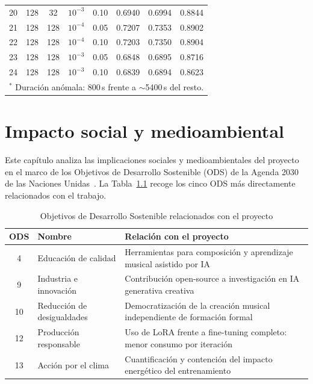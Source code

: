\documentclass[%
    school=etsisi,%
    type=pfg,%
    degree=61CD,%
]{upm-report}
\begin{document}
\begin{table}[htbp]
{\begin{tabular}{cccccccc}
        20 & 128 & 32  & $10^{-3}$ & 0.10 & 0.6940 & 0.6994 & 0.8844 \\
        21 & 128 & 128 & $10^{-4}$ & 0.05 & 0.7207 & 0.7353 & 0.8902 \\
        22 & 128 & 128 & $10^{-4}$ & 0.10 & 0.7203 & 0.7350 & 0.8904 \\
        23 & 128 & 128 & $10^{-3}$ & 0.05 & 0.6848 & 0.6895 & 0.8716 \\
        24 & 128 & 128 & $10^{-3}$ & 0.10 & 0.6839 & 0.6894 & 0.8623 \\
        \bottomrule
        \multicolumn{8}{l}{$^{*}$ Duraci\'on an\'omala: 800\,s frente a ${\sim}$5400\,s del resto.}
    \end{tabular}}%
\end{table}

\chapter{Impacto social y medioambiental}
\label{ch:impacto}

Este cap\'itulo analiza las implicaciones sociales y medioambientales del proyecto en el marco de los Objetivos de Desarrollo Sostenible (ODS) de la Agenda 2030 de las Naciones Unidas~\cite{onu2015agenda2030}. La Tabla~\ref{tab:ods-resumen} recoge los cinco ODS m\'as directamente relacionados con el trabajo.

\begin{table}[htbp]
    \centering
    \caption{Objetivos de Desarrollo Sostenible relacionados con el proyecto}
    \label{tab:ods-resumen}
    \small
    \begin{tabular}{clp{7.5cm}}
        \toprule
        \textbf{ODS} & \textbf{Nombre} & \textbf{Relaci\'on con el proyecto} \\
        \midrule
        4  & Educaci\'on de calidad           & Herramientas para composici\'on y aprendizaje musical asistido por IA \\
        9  & Industria e innovaci\'on         & Contribuci\'on open-source a investigaci\'on en IA generativa creativa \\
        10 & Reducci\'on de desigualdades     & Democratizaci\'on de la creaci\'on musical independiente de formaci\'on formal \\
        12 & Producci\'on responsable         & Uso de LoRA frente a fine-tuning completo: menor consumo por iteraci\'on \\
        13 & Acci\'on por el clima            & Cuantificaci\'on y contenci\'on del impacto energ\'etico del entrenamiento \\
        \bottomrule
    \end{tabular}
\end{table}
\end{document}
